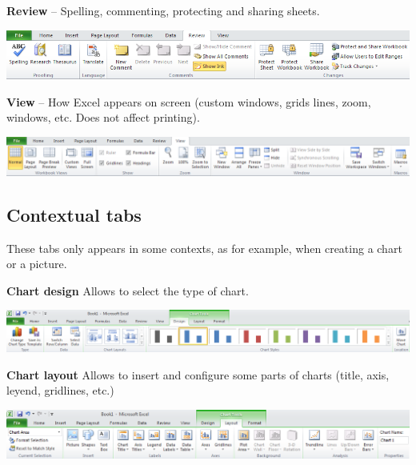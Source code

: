 \textbf{Review} – Spelling, commenting, protecting and sharing sheets.

\begin{center}
\includegraphics[max width=\linewidth]{../img/excel_2010_review_ribbon.png}
\end{center}

\textbf{View} – How Excel appears on screen (custom windows, grids lines, zoom, windows, etc. Does not affect printing).

\begin{center}
\includegraphics[max width=\linewidth]{../img/excel_2010_view_ribbon.png}
\end{center}


\subsection{Contextual tabs}\hypertarget{contextual-tabs}{}\label{contextual-tabs}

These tabs only appears in some contexts, as for example, when creating a chart or a picture.

\textbf{Chart design} Allows to select the type of chart.

\begin{center}
\includegraphics[max width=\linewidth]{../img/excel_2010_design_chart_ribbon.png}
\end{center}

\textbf{Chart layout} Allows to insert and configure some parts of charts (title, axis, leyend, gridlines, etc.)

\begin{center}
\includegraphics[max width=\linewidth]{../img/excel_2010_layout_chart_ribbon.png}
\end{center}

